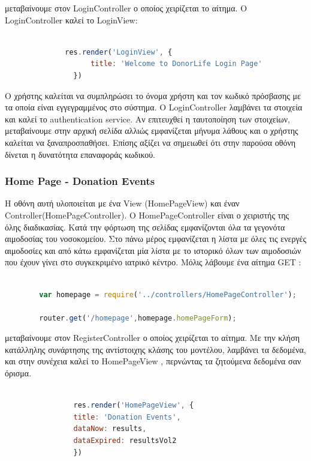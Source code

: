 μεταβαίνουμε στον LoginController ο οποίος χειρίζεται το αίτημα. Ο LoginController καλεί το LoginView:



		\begin{lstlisting}[language=Javascript]			
		
              res.render('LoginView', {
                    title: 'Welcome to DonorLife Login Page'
                })


		\end{lstlisting}

		Ο χρήστης καλείται να συμπληρώσει το όνομα χρήστη και τον κωδικό πρόσβασης με τα οποία είναι εγγεγραμμένος στο σύστημα. Ο LoginController λαμβάνει  τα στοιχεία και καλεί το authentication service. Αν επιτευχθεί  η  ταυτοποίηση των στοιχείων, μεταβαίνουμε στην αρχική σελίδα αλλιώς εμφανίζεται μήνυμα λάθους και ο χρήστης καλείται να ξαναπροσπαθήσει. Επίσης αξίζει να σημειωθεί ότι στην παρούσα οθόνη δίνεται η δυνατότητα επαναφοράς κωδικού.
		
		
				\subsubsection{Home Page - Donation Events}
		
	Η οθόνη αυτή υλοποιείται με ένα View (HomePageView) και έναν Controller(HomePageController).  O HomePageController είναι ο χειριστής της όλης διαδικασίας. Κατά την φόρτωση της σελίδας εμφανίζονται όλα τα γεγονότα αιμοδοσίας του νοσοκομείου. Στο πάνω μέρος εμφανίζεται η λίστα με όλες τις ενεργές αιμοδοσίες και από κάτω εμφανίζεται μία λίστα με το ιστορικό όλων των αιμοδοσιών που έχουν γίνει στο συγκεκριμένο ιατρικό κέντρο. Μόλις λάβουμε ένα αίτημα GET :
		
		\begin{lstlisting}[language=Javascript]			
		
		var homepage = require('../controllers/HomePageController');
		
		router.get('/homepage',homepage.homePageForm);  


		\end{lstlisting}
		
μεταβαίνουμε στον RegisterController ο οποίος χειρίζεται το αίτημα. Με την κλήση κατάλληλης συνάρτησης της αντίστοιχης κλάσης του μοντέλου, λαμβάνει τα δεδομένα,  και στην συνέχεια καλεί το HomePageView , περνώντας τα ζητούμενα δεδομένα σαν όρισμα.



		\begin{lstlisting}[language=Javascript]			
		
	            res.render('HomePageView', { 
                title: 'Donation Events',
                dataNow: results,
                dataExpired: resultsVol2
                })

		\end{lstlisting}
		
